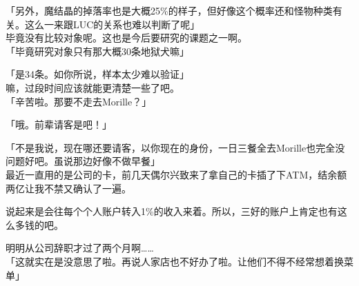 「另外，魔结晶的掉落率也是大概25\%的样子，但好像这个概率还和怪物种类有关。这么一来跟LUC的关系也难以判断了呢」\\

毕竟没有比较对象呢。这也是今后要研究的课题之一啊。\\

「毕竟研究对象只有那大概30条地狱犬嘛」

「是34条。如你所说，样本太少难以验证」\\

嘛，过段时间应该就能更清楚一些了吧。\\

「辛苦啦。那要不走去Morille？」

「哦。前辈请客是吧！」

「不是我说，现在哪还要请客，以你现在的身份，一日三餐全去Morille也完全没问题好吧。虽说那边好像不做早餐」\\

最近一直用的是公司的卡，前几天偶尔兴致来了拿自己的卡插了下ATM，结余额两亿让我不禁又确认了一遍。

说起来是会往每个个人账户转入1\%的收入来着。所以，三好的账户上肯定也有这么多钱的吧。

明明从公司辞职才过了两个月啊……\\

「这就实在是没意思了啦。再说人家店也不好办了啦。让他们不得不经常想着换菜单」

